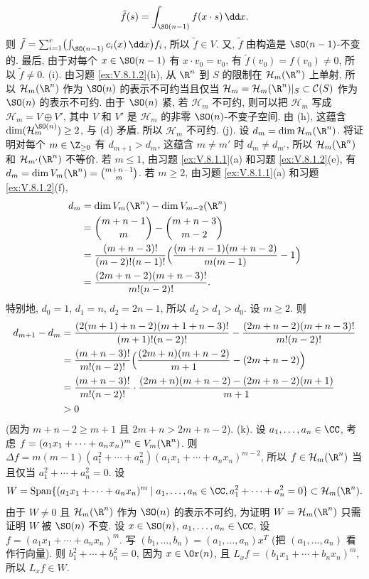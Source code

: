 \begin{solution}
\[
\tilde{f}(s) = \int_{\SO(n-1)}f(x \cdot s)\,\dd x.
\]
则 $\tilde{f} = \sum_{i=1}^r\bigl(\int_{\SO(n-1)}c_i(x)\,\dd x\bigr)f_i$, 所以 $\tilde{f} \in V$. 又, $\tilde{f}$ 由构造是 $\SO(n-1)$-不变的. 最后, 由于对每个 $x \in \SO(n-1)$ 有 $x \cdot v_0 = v_0$, 有 $\tilde{f}(v_0) = f(v_0) \neq 0$, 所以 $\tilde{f} \neq 0$.
(i). 由习题 \ref{ex:V.8.1.2}(h), 从 $\R^n$ 到 $S$ 的限制在 $\mathcal{H}_m(\R^n)$ 上单射, 所以 $\mathcal{H}_m(\R^n)$ 作为 $\SO(n)$ 的表示不可约当且仅当 $\mathcal{H}_m = \mathcal{H}_m(\R^n)|_S \subset \mathcal{C}(S)$ 作为 $\SO(n)$ 的表示不可约. 由于 $\SO(n)$ 紧, 若 $\mathcal{H}_m$ 不可约, 则可以把 $\mathcal{H}_m$ 写成 $\mathcal{H}_m = V \oplus V'$, 其中 $V$ 和 $V'$ 是 $\mathcal{H}_m$ 的非零 $\SO(n)$-不变子空间. 由 (h), 这蕴含 $\dim(\mathcal{H}_m^{\SO(n)}) \geq 2$, 与 (d) 矛盾. 所以 $\mathcal{H}_m$ 不可约.
(j). 设 $d_m = \dim\mathcal{H}_m(\R^n)$. 将证明对每个 $m \in \Z_{\geq 0}$ 有 $d_{m+1} > d_m$, 这蕴含 $m \neq m'$ 时 $d_m \neq d_{m'}$, 所以 $\mathcal{H}_m(\R^n)$ 和 $\mathcal{H}_{m'}(\R^n)$ 不等价.
若 $m \leq 1$, 由习题 \ref{ex:V.8.1.1}(a) 和习题 \ref{ex:V.8.1.2}(e), 有 $d_m = \dim V_m(\R^n) = \binom{m+n-1}{m}$. 若 $m \geq 2$, 由习题 \ref{ex:V.8.1.1}(a) 和习题 \ref{ex:V.8.1.2}(f),
\begin{align*}
d_m &= \dim V_m(\R^n) - \dim V_{m-2}(\R^n) \\
&= \binom{m+n-1}{m} - \binom{m+n-3}{m-2} \\
&= \frac{(m+n-3)!}{(m-2)!(n-1)!}\Bigl(\frac{(m+n-1)(m+n-2)}{m(m-1)} - 1\Bigr) \\
&= \frac{(2m+n-2)(m+n-3)!}{m!(n-2)!}.
\end{align*}
特别地, $d_0 = 1$, $d_1 = n$, $d_2 = 2n-1$, 所以 $d_2 > d_1 > d_0$. 设 $m \geq 2$. 则
\begin{align*}
d_{m+1} - d_m &= \frac{(2(m+1)+n-2)(m+1+n-3)!}{(m+1)!(n-2)!} - \frac{(2m+n-2)(m+n-3)!}{m!(n-2)!} \\
&= \frac{(m+n-3)!}{m!(n-2)!}\Bigl(\frac{(2m+n)(m+n-2)}{m+1} - (2m+n-2)\Bigr) \\
&= \frac{(m+n-3)!}{m!(n-2)!}\cdot\frac{(2m+n)(m+n-2) - (2m+n-2)(m+1)}{m+1} \\
&> 0
\end{align*}
(因为 $m + n - 2 \geq m + 1$ 且 $2m + n > 2m + n - 2$).
(k). 设 $a_1, \ldots, a_n \in \CC$, 考虑 $f = (a_1x_1 + \cdots + a_nx_n)^m \in V_m(\R^n)$. 则 $\Delta f = m(m-1)(a_1^2 + \cdots + a_n^2)(a_1x_1 + \cdots + a_nx_n)^{m-2}$, 所以 $f \in \mathcal{H}_m(\R^n)$ 当且仅当 $a_1^2 + \cdots + a_n^2 = 0$. 设
\[
W = \operatorname{Span}\{(a_1x_1 + \cdots + a_nx_n)^m \mid a_1, \ldots, a_n \in \CC, a_1^2 + \cdots + a_n^2 = 0\} \subset \mathcal{H}_m(\R^n).
\]
由于 $W \neq 0$ 且 $\mathcal{H}_m(\R^n)$ 作为 $\SO(n)$ 的表示不可约, 为证明 $W = \mathcal{H}_m(\R^n)$ 只需证明 $W$ 被 $\SO(n)$ 不变. 设 $x \in \SO(n)$, $a_1, \ldots, a_n \in \CC$, 设 $f = (a_1x_1 + \cdots + a_nx_n)^m$. 写 $(b_1, \ldots, b_n) = (a_1, \ldots, a_n)x^T$ (把 $(a_1, \ldots, a_n)$ 看作行向量). 则 $b_1^2 + \cdots + b_n^2 = 0$, 因为 $x \in \Or(n)$, 且 $L_xf = (b_1x_1 + \cdots + b_nx_n)^m$, 所以 $L_xf \in W$.
\end{solution}

